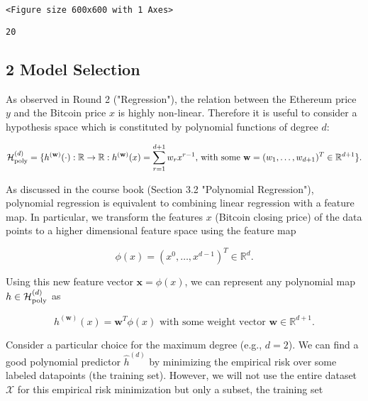 \documentclass[11pt]{article}
\begin{document}
    
    \begin{verbatim}
<Figure size 600x600 with 1 Axes>
    \end{verbatim}

    
    \begin{Verbatim}[commandchars=\\\{\}]
20

    \end{Verbatim}

    \subsection{2 Model Selection}\label{model-selection}

As observed in Round 2 ("Regression"), the relation between the Ethereum
price \(y\) and the Bitcoin price \(x\) is highly non-linear. Therefore
it is useful to consider a hypothesis space which is constituted by
polynomial functions of degree \(d\):

\begin{equation}
\label{equ_def_poly_hyposapce}
\mathcal{H}^{(d)}_{\rm poly} = \{ h^{(\mathbf{w})}(\cdot): \mathbb{R} \rightarrow \mathbb{R}: h^{(\mathbf{w})}(x) = \sum_{r=1}^{d+1} w_{r} x^{r-1} \mbox{, with some } \mathbf{w} =(w_{1},\ldots,w_{d+1})^{T} \in \mathbb{R}^{d+1} \}.
\end{equation}

As discussed in the course book (Section 3.2 "Polynomial Regression"),
polynomial regression is equivalent to combining linear regression with
a feature map. In particular, we transform the features \(x\) (Bitcoin
closing price) of the data points to a higher dimensional feature space
using the feature map

\begin{equation}
\phi(x) = (x^{0},\ldots,x^{d-1})^{T} \in \mathbb{R}^{d}.
\label{eq7}
\tag{7}
\end{equation}

Using this new feature vector \(\mathbf{x}=\phi(x)\), we can represent
any polynomial map \(h \in \mathcal{H}^{(d)}_{\rm poly}\) as

\begin{equation} 
h^{(\mathbf{w})}(x) = \mathbf{w}^{T} \phi(x) \mbox{ with some weight vector } \mathbf{w} \in \mathbb{R}^{d+1}.
\label{eq8}
\tag{8}
\end{equation}

Consider a particular choice for the maximum degree (e.g., \(d=2\)). We
can find a good polynomial predictor \(\hat{h}^{(d)}\) by minimizing the
empirical risk over some labeled datapoints (the training set). However,
we will not use the entire dataset \(\mathcal{X}\) for this empirical
risk minimization but only a subset, the training set
\end{document}
